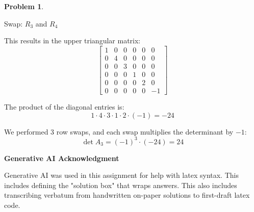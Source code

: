 \documentclass[12pt, oneside]{amsart}
\theoremstyle{definition}
\newtheorem{prob}{Problem}
\begin{document}
\begin{prob}
\begin{enumerate}
\begin{solution}
    Swap: $R_3$ and $R_4$

    This results in the upper triangular matrix:
    \[
    \begin{bmatrix}
    1 & 0 & 0 & 0 & 0 & 0 \\
    0 & 4 & 0 & 0 & 0 & 0 \\
    0 & 0 & 3 & 0 & 0 & 0 \\
    0 & 0 & 0 & 1 & 0 & 0 \\
    0 & 0 & 0 & 0 & 2 & 0 \\
    0 & 0 & 0 & 0 & 0 & -1
    \end{bmatrix}
    \]
    
    The product of the diagonal entries is:
    \[
    1 \cdot 4 \cdot 3 \cdot 1 \cdot 2 \cdot (-1) = -24
    \]
    
    We performed 3 row swaps, and each swap multiplies the determinant by $-1$:
    \[
    \det A_3 = (-1)^3 \cdot (-24) = 24
    \]
    \end{solution}
\end{enumerate}
\end{prob}
\noindent \textbf{Generative AI Acknowledgment}

\noindent Generative AI was used in this assignment for help with latex syntax. This includes defining the "solution box" that wraps answers. This also includes transcribing verbatum from handwritten on-paper solutions to first-draft latex code.
\end{document}
